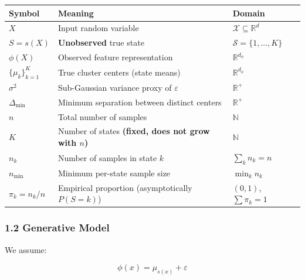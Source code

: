 \documentclass[
  12pt,
]{article}
\begin{document}
\begin{longtable}[]{@{}
  >{\raggedright\arraybackslash}p{}
  >{\raggedright\arraybackslash}p{}
  >{\raggedright\arraybackslash}p{}@{}}
\toprule\noalign{}
\begin{minipage}[b]{\linewidth}\raggedright
Symbol
\end{minipage} & \begin{minipage}[b]{\linewidth}\raggedright
Meaning
\end{minipage} & \begin{minipage}[b]{\linewidth}\raggedright
Domain
\end{minipage} \\
\midrule\noalign{}
\endhead
\bottomrule\noalign{}
\endlastfoot
\(X\) & Input random variable &
\(\mathcal{X} \subseteq \mathbb{R}^d\) \\
\(S = s(X)\) & \textbf{Unobserved} true state &
\(\mathcal{S} = \{1, \dots, K\}\) \\
\(\phi(X)\) & Observed feature representation &
\(\mathbb{R}^{d_\phi}\) \\
\(\{\mu_k\}_{k=1}^K\) & True cluster centers (state means) &
\(\mathbb{R}^{d_\phi}\) \\
\(\sigma^2\) & Sub-Gaussian variance proxy of \(\varepsilon\) &
\(\mathbb{R}^+\) \\
\(\Delta_{\min}\) & Minimum separation between distinct centers &
\(\mathbb{R}^+\) \\
\(n\) & Total number of samples & \(\mathbb{N}\) \\
\(K\) & Number of states \textbf{(fixed, does not grow with \(n\))} &
\(\mathbb{N}\) \\
\(n_k\) & Number of samples in state \(k\) & \(\sum_k n_k = n\) \\
\(n_{\min}\) & Minimum per-state sample size & \(\min_k n_k\) \\
\(\pi_k = n_k/n\) & Empirical proportion (asymptotically \(P(S=k)\)) &
\((0,1)\), \(\sum \pi_k = 1\) \\
\end{longtable}

\subsubsection{1.2 Generative Model}\label{generative-model}

We assume:

\[\phi(x) = \mu_{s(x)} + \varepsilon\]
\end{document}
